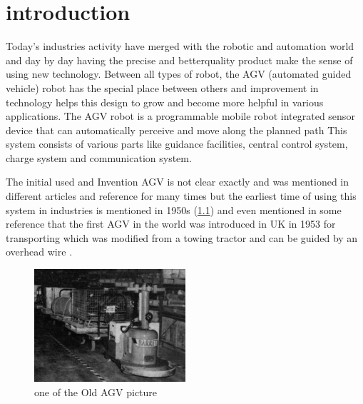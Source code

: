 \documentclass[a4paper,12pt]{extreport}
\begin{document}
\centering
\tableofcontents
\newpage

\listoffigures
\newpage

\listoftables
\newpage
\justifying
\chapter{introduction}

Today’s industries activity have merged
with the robotic and automation world and
day by day having the precise and betterquality
product make the sense of using
new technology. Between all types of
robot, the AGV (automated guided
vehicle) robot has the special place
between others and improvement in
technology helps this design to grow and
become more helpful in various
applications. The AGV robot is a
programmable mobile robot integrated
sensor device that can automatically
perceive and move along the planned
path\cite{das2016design} This system consists of various
parts like guidance facilities, central
control system, charge system and
communication system\cite{moshayedi2019agv}. 

The initial used and Invention AGV is not clear exactly and
was mentioned in different articles and
reference for many times but the earliest
time of using this system in industries is
mentioned in 1950s \cite{reveliotis2000conflict}
(\cref{oldAgv}) and even
mentioned in some reference that the first
AGV in the world was introduced in UK in
1953 for transporting which was modified
from a towing tractor and can be guided by
an overhead wire \cite{moshayedi2019agv}.

\begin{figure}[H]
    \centering
\includegraphics[width=0.5\textwidth]{doc/oldestAGV.jpg}
\caption{one of the Old AGV picture}
\label{oldAgv} %
\end{figure}
\end{document}
